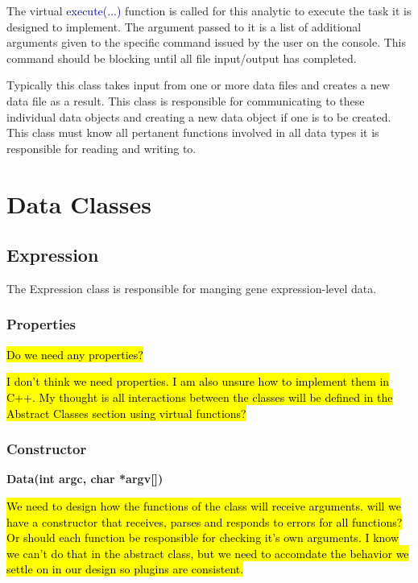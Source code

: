 \documentclass[10pt]{article}
\providecommand{\stephen}[1]{\sethlcolor{lyellow}\hl{#1}}
\providecommand{\josh}[1]{\sethlcolor{lblue}\hl{#1}}
\providecommand{\h}[1]{\textcolor{darkblue}{#1}}
\begin{document}
The virtual \h{execute(...)} function is called for this analytic to execute 
the task it is designed to implement. The argument passed to it is a list of 
additional arguments given to the specific command issued by the user on the 
console. This command should be blocking until all file input/output has 
completed.

Typically this class takes input from one or more data files and creates a new 
data file as a result. This class is responsible for communicating to these 
individual data objects and creating a new data object if one is to be created. 
This class must know all pertanent functions involved in all data types it is 
responsible for reading and writing to.


















\newpage
\section{Data Classes}

\subsection{Expression}

The Expression class is responsible for manging gene expression-level data.  

\subsubsection{Properties}

\stephen{Do we need any properties?}

\josh{I don't think we need properties. I am also unsure how to implement them 
in C++. My thought is all interactions between the classes will be defined in 
the Abstract Classes section using virtual functions?}

\subsubsection{Constructor}

{\bfseries Data(int argc, char *argv[])}

\stephen{We need to design how the functions of the class will receive 
arguments.  will we have a constructor that receives, parses and responds to 
errors for all functions?  Or should each function be responsible for checking 
it's own arguments. I know we can't do that in the abstract class, but 
we need to accomdate the behavior we settle on in our design so plugins
are consistent.}
\end{document}
